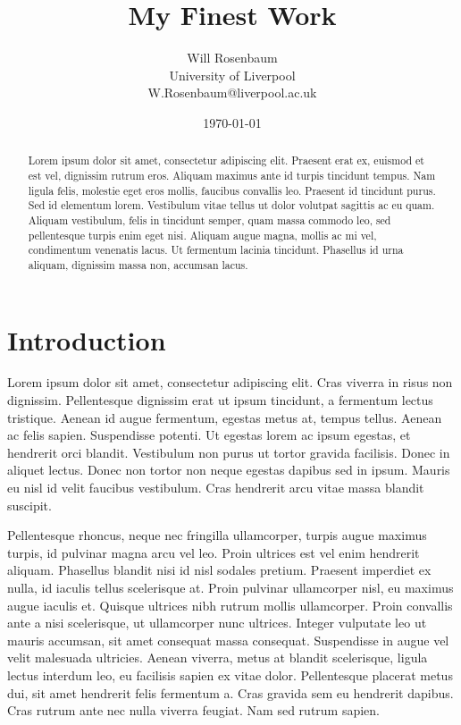 \documentclass[11pt]{article}
\title{My Finest Work}
\author{
  Will Rosenbaum\\
  University of Liverpool\\
  W.Rosenbaum@liverpool.ac.uk
}
\date{\today}
\theoremstyle{definition}
\begin{document}
\maketitle

\thispagestyle{empty}

\begin{abstract}
    Lorem ipsum dolor sit amet, consectetur adipiscing elit. Praesent erat ex, euismod et est vel, dignissim rutrum eros. Aliquam maximus ante id turpis tincidunt tempus. Nam ligula felis, molestie eget eros mollis, faucibus convallis leo. Praesent id tincidunt purus. Sed id elementum lorem. Vestibulum vitae tellus ut dolor volutpat sagittis ac eu quam. Aliquam vestibulum, felis in tincidunt semper, quam massa commodo leo, sed pellentesque turpis enim eget nisi. Aliquam augue magna, mollis ac mi vel, condimentum venenatis lacus. Ut fermentum lacinia tincidunt. Phasellus id urna aliquam, dignissim massa non, accumsan lacus.
\end{abstract}

%

\section{Introduction}
\label{sec:introduction}

Lorem ipsum dolor sit amet, consectetur adipiscing elit. Cras viverra in risus non dignissim. Pellentesque dignissim erat ut ipsum tincidunt, a fermentum lectus tristique. Aenean id augue fermentum, egestas metus at, tempus tellus. Aenean ac felis sapien. Suspendisse potenti. Ut egestas lorem ac ipsum egestas, et hendrerit orci blandit. Vestibulum non purus ut tortor gravida facilisis. Donec in aliquet lectus. Donec non tortor non neque egestas dapibus sed in ipsum. Mauris eu nisl id velit faucibus vestibulum. Cras hendrerit arcu vitae massa blandit suscipit.

Pellentesque rhoncus, neque nec fringilla ullamcorper, turpis augue maximus turpis, id pulvinar magna arcu vel leo. Proin ultrices est vel enim hendrerit aliquam. Phasellus blandit nisi id nisl sodales pretium. Praesent imperdiet ex nulla, id iaculis tellus scelerisque at. Proin pulvinar ullamcorper nisl, eu maximus augue iaculis et. Quisque ultrices nibh rutrum mollis ullamcorper. Proin convallis ante a nisi scelerisque, ut ullamcorper nunc ultrices. Integer vulputate leo ut mauris accumsan, sit amet consequat massa consequat. Suspendisse in augue vel velit malesuada ultricies. Aenean viverra, metus at blandit scelerisque, ligula lectus interdum leo, eu facilisis sapien ex vitae dolor. Pellentesque placerat metus dui, sit amet hendrerit felis fermentum a. Cras gravida sem eu hendrerit dapibus. Cras rutrum ante nec nulla viverra feugiat. Nam sed rutrum sapien.\cite{Turing1937-computable}



\end{document}
